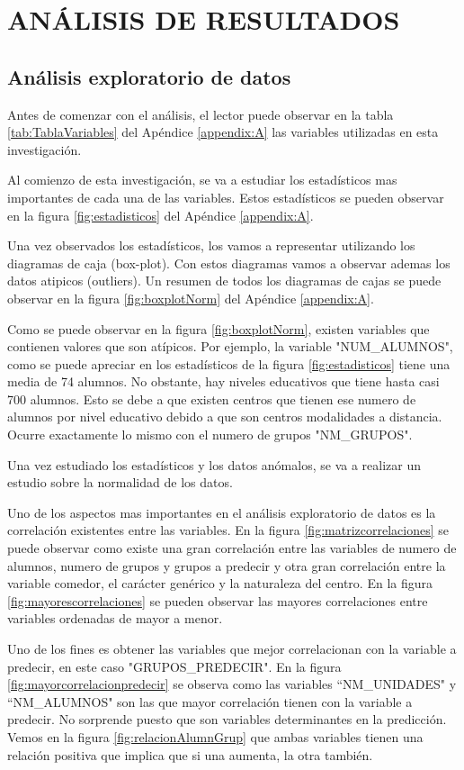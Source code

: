 \chapter{ANÁLISIS DE RESULTADOS}
\section{Análisis exploratorio de datos}

Antes de comenzar con el análisis, el lector puede observar en la tabla \ref{tab:TablaVariables} del Apéndice \ref{appendix:A} las variables utilizadas en esta investigación. 

Al comienzo de esta investigación, se va a estudiar los estadísticos mas importantes de cada una de las variables. Estos estadísticos se pueden observar en la figura \ref{fig:estadisticos} del Apéndice \ref{appendix:A}.

Una vez observados los estadísticos, los vamos a representar utilizando los diagramas de caja (box-plot). Con estos diagramas vamos a observar ademas los datos atipicos (outliers). Un resumen de todos los diagramas de cajas se puede observar en la figura \ref{fig:boxplotNorm} del Apéndice \ref{appendix:A}. 

Como se puede observar en la figura \ref{fig:boxplotNorm}, existen variables que contienen valores que son atípicos. Por ejemplo, la variable "NUM\_ALUMNOS", como se puede apreciar en los estadísticos de la figura \ref{fig:estadisticos} tiene una media de 74 alumnos. No obstante, hay niveles educativos que tiene hasta casi 700 alumnos. Esto se debe a que existen centros que tienen ese numero de alumnos por nivel educativo debido a que son centros modalidades a distancia. Ocurre exactamente lo mismo con el numero de grupos "NM\_GRUPOS".

Una vez estudiado los estadísticos y los datos anómalos, se va a realizar un estudio sobre la normalidad de los datos. 

Uno de los aspectos mas importantes en el análisis exploratorio de datos es la correlación existentes entre las variables. En la figura \ref{fig:matrizcorrelaciones} se puede observar como existe una gran correlación entre las variables de numero de alumnos, numero de grupos y grupos a predecir y otra gran correlación entre la variable comedor, el carácter genérico y la naturaleza del centro. En la figura \ref{fig:mayorescorrelaciones} se pueden observar las mayores correlaciones entre variables ordenadas de mayor a menor.

Uno de los fines es obtener las variables que mejor correlacionan con la variable a predecir, en este caso "GRUPOS\_PREDECIR". En la figura \ref{fig:mayorcorrelacionpredecir} se observa como las variables ``NM\_UNIDADES" y ``NM\_ALUMNOS" son las que mayor correlación tienen con la variable a predecir. No sorprende puesto que son variables determinantes en la predicción. Vemos en la figura \ref{fig:relacionAlumnGrup} que ambas variables tienen una relación positiva que implica que si una aumenta, la otra también.






